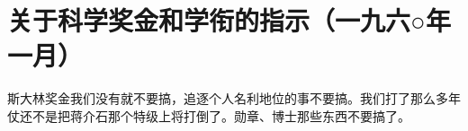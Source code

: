 \section[关于科学奖金和学衔的指示（一九六○年一月）]{关于科学奖金和学衔的指示（一九六○年一月）}


斯大林奖金我们没有就不要搞，追逐个人名利地位的事不要搞。我们打了那么多年仗还不是把蒋介石那个特级上将打倒了。勋章、博士那些东西不要搞了。


